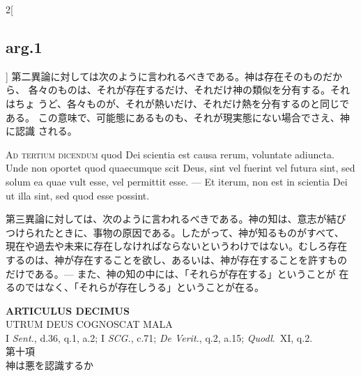 \documentclass[paper=a4paper,fontsize=10pt,jafontsize=9pt,titlepage]{jlreq}
\begin{document}
\begin{paracol}{2}[\subsection{arg.1}]
第二異論に対しては次のように言われるべきである。神は存在そのものだから、
各々のものは、それが存在するだけ、それだけ神の類似を分有する。それはちょ
うど、各々ものが、それが熱いだけ、それだけ熱を分有するのと同じである。
この意味で、可能態にあるものも、それが現実態にない場合でさえ、神に認識
される。

\switchcolumn*[\subsection{ad.3}]

{\scshape Ad tertium dicendum} quod Dei scientia est causa rerum,
voluntate adiuncta. Unde non oportet quod quaecumque scit Deus, sint
vel fuerint vel futura sint, sed solum ea quae vult esse, vel
permittit esse. --- Et iterum, non est in scientia Dei ut illa sint,
sed quod esse possint.

\switchcolumn

第三異論に対しては、次のように言われるべきである。神の知は、意志が結び
つけられたときに、事物の原因である。したがって、神が知るものがすべて、
現在や過去や未来に存在しなければならないというわけではない。むしろ存在
するのは、神が存在することを欲し、あるいは、神が存在することを許すもの
だけである。--- また、神の知の中には、「それらが存在する」ということが
在るのではなく、「それらが存在しうる」ということが在る。

\end{paracol}


\newpage


{}
\setcounter{section}{10}
\setcounter{subsection}{0}
\begin{center}
{\Large {\bfseries ARTICULUS DECIMUS}}\\ {\large UTRUM DEUS COGNOSCAT
MALA}\\ {\footnotesize I {\itshape Sent.}, d.36, q.1, a.2; I
{\itshape SCG.}, c.71; {\itshape De Verit.}, q.2, a.15; {\itshape
Quodl}.~XI, q.2.}\\ {\Large 第十項\\神は悪を認識するか}
\end{center}
\end{document}
